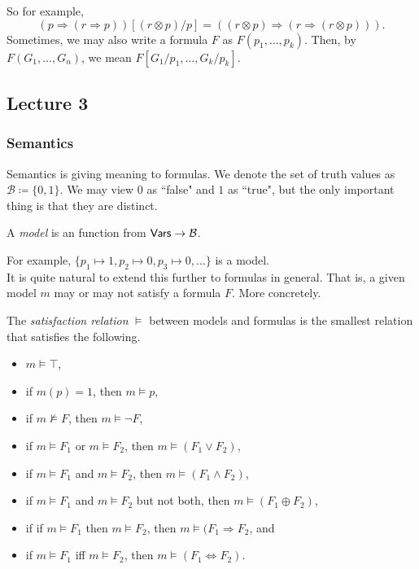 So for example,
\[ (p\Rightarrow (r\Rightarrow p))[(r\otimes p)/p] = ((r\otimes p)\Rightarrow (r\Rightarrow (r\otimes p))). \]
Sometimes, we may also write a formula $F$ as $F(p_1,\ldots,p_k)$. Then, by $F(G_1,\ldots,G_n)$, we mean $F[G_1/p_1,\ldots,G_k/p_k]$.

\subsection{Lecture 3}

\subsubsection{Semantics}

Semantics is giving meaning to formulas. We denote the set of truth values as $\mathcal{B}\coloneqq\{0,1\}$. We may view $0$ as ``false" and $1$ as ``true", but the only important thing is that they are distinct.

\begin{definition}[Model]
A \textit{model} is an function from $\mathsf{Vars}\to\mathcal{B}$.
\end{definition}

For example, $\{p_1\mapsto 1, p_2\mapsto 0, p_3\mapsto 0,\ldots\}$ is a model. \\
It is quite natural to extend this further to formulas in general. That is, a given model $m$ may or may not satisfy a formula $F$. More concretely.

\begin{definition}
The \textit{satisfaction relation} $\vDash$ between models and formulas is the smallest relation that satisfies the following.
\begin{itemize}
    \item $m\vDash\top$,
    \item if $m(p)=1$, then $m\vDash p$,
    \item if $m\nvDash F$, then $m\vDash\neg F$,
    \item if $m\vDash F_1$ or $m\vDash F_2$, then $m\vDash (F_1\vee F_2)$,
    \item if $m\vDash F_1$ and $m\vDash F_2$, then $m\vDash (F_1\wedge F_2)$,
    \item if $m\vDash F_1$ and $m\vDash F_2$ but not both, then $m\vDash (F_1\oplus F_2)$,
    \item if if $m\vDash F_1$ then $m\vDash F_2$, then $m\vDash (F_1\Rightarrow F_2$, and
    \item if $m\vDash F_1$ iff $m\vDash F_2$, then $m\vDash (F_1\Leftrightarrow F_2)$.
\end{itemize}
\end{definition}

